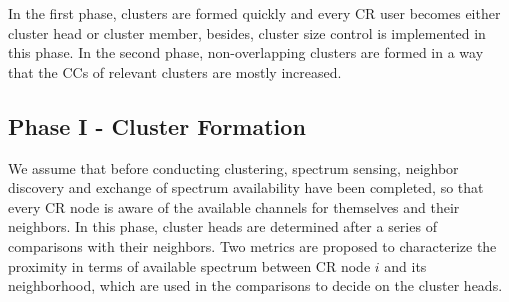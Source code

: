 \documentclass[times]{ettauth}
\theoremstyle{mytheoremstyle}
\theoremstyle{mytheoremstyle}
\theoremstyle{mytheoremstyle}
\begin{document}
In the first phase, clusters are formed quickly and every CR user becomes either cluster head or cluster member, besides, cluster size control is implemented in this phase.
In the second phase, non-overlapping clusters are formed in a way that the CCs of relevant clusters are mostly increased.

	

\subsection{Phase I - Cluster Formation}
\label{phaseI}
We assume that before conducting clustering, spectrum sensing, neighbor discovery and exchange of spectrum availability have been completed, so that every CR node is aware of the available channels for themselves and their neighbors.
In this phase, cluster heads are determined after a series of comparisons with their neighbors. 
Two metrics are proposed to characterize the proximity in terms of available spectrum between CR node $i$ and its neighborhood, which are used in the comparisons to decide on the cluster heads.


\end{document}
